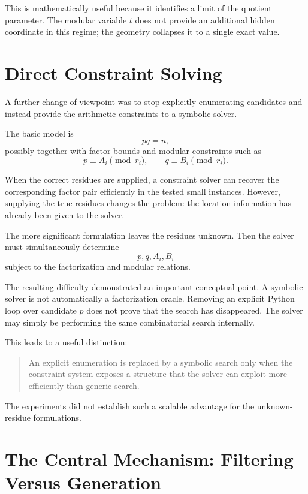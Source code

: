 \documentclass[11pt,a4paper]{article}
\begin{document}
This is mathematically useful because it identifies a limit of the quotient parameter. The modular variable $t$ does not provide an additional hidden coordinate in this regime; the geometry collapses it to a single exact value.

\section{Direct Constraint Solving}

A further change of viewpoint was to stop explicitly enumerating candidates and instead provide the arithmetic constraints to a symbolic solver.

The basic model is
\[
    pq=n,
\]
possibly together with factor bounds and modular constraints such as
\[
    p\equiv A_i\pmod{r_i},
    \qquad
    q\equiv B_i\pmod{r_i}.
\]

When the correct residues are supplied, a constraint solver can recover the corresponding factor pair efficiently in the tested small instances. However, supplying the true residues changes the problem: the location information has already been given to the solver.

The more significant formulation leaves the residues unknown. Then the solver must simultaneously determine
\[
    p,
    q,
    A_i,
    B_i
\]
subject to the factorization and modular relations.

The resulting difficulty demonstrated an important conceptual point. A symbolic solver is not automatically a factorization oracle. Removing an explicit Python loop over candidate $p$ does not prove that the search has disappeared. The solver may simply be performing the same combinatorial search internally.

This leads to a useful distinction:

\begin{quote}
An explicit enumeration is replaced by a symbolic search only when the constraint system exposes a structure that the solver can exploit more efficiently than generic search.
\end{quote}

The experiments did not establish such a scalable advantage for the unknown-residue formulations.

\section{The Central Mechanism: Filtering Versus Generation}
\end{document}
